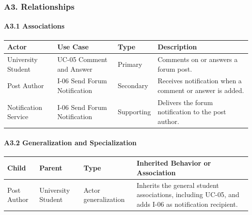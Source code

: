 \documentclass[12pt]{article}
\renewcommand{\baselinestretch}{1.5}
\begin{document}
\hypertarget{sec:a3-relationships}{}
\subsubsection*{A3. Relationships}
\par\medskip

\hypertarget{sec:a3-1-associations}{}
\paragraph*{A3.1 Associations}
\par\medskip

\begingroup
\small
\renewcommand{\baselinestretch}{1.0}\selectfont
\renewcommand{\arraystretch}{1.15}
\setlength{\tabcolsep}{6pt}
\begin{longtable}{|>{\raggedright\arraybackslash}p{}|>{\raggedright\arraybackslash}p{}|>{\raggedright\arraybackslash}p{}|>{\raggedright\arraybackslash}p{}|}
\hline
\textbf{Actor} & \textbf{Use Case} & \textbf{Type} & \textbf{Description} \\ \hline
\endhead
University Student & UC-05 Comment and Answer & Primary & Comments on or answers a forum post. \\ \hline
Post Author & I-06 Send Forum Notification & Secondary & Receives notification when a comment or answer is added. \\ \hline
Notification Service & I-06 Send Forum Notification & Supporting & Delivers the forum notification to the post author. \\ \hline
\end{longtable}
\endgroup
\par\medskip

\hypertarget{sec:a3-2-generalization-and-specialization}{}
\paragraph*{A3.2 Generalization and Specialization}
\par\medskip

\begingroup
\small
\renewcommand{\baselinestretch}{1.0}\selectfont
\renewcommand{\arraystretch}{1.15}
\setlength{\tabcolsep}{6pt}
\begin{longtable}{|>{\raggedright\arraybackslash}p{}|>{\raggedright\arraybackslash}p{}|>{\raggedright\arraybackslash}p{}|>{\raggedright\arraybackslash}p{}|}
\hline
\textbf{Child} & \textbf{Parent} & \textbf{Type} & \textbf{Inherited Behavior or Association} \\ \hline
\endhead
Post Author & University Student & Actor generalization & Inherits the general student associations, including UC-05, and adds I-06 as notification recipient. \\ \hline
\end{longtable}
\endgroup
\par\medskip
\end{document}
